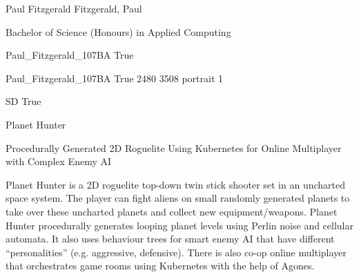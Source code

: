 
\begingroup{}\relax



\def\Key{Paul_Fitzgerald_107BA}

{Paul Fitzgerald}
{Fitzgerald, Paul}

{Bachelor of Science (Honours) in Applied Computing}

{Paul_Fitzgerald_107BA}
{True}

{Paul_Fitzgerald_107BA}
{True}
{2480}
{3508}
{portrait}
{1}

{SD}
{True}

{Planet Hunter}

{Procedurally Generated 2D Roguelite Using Kubernetes for Online Multiplayer with Complex Enemy AI}

{Planet Hunter is a 2D roguelite top-down twin stick shooter set in an uncharted space system. The player can fight aliens on small randomly generated planets to take over these uncharted planets and collect new equipment/weapons. Planet Hunter procedurally generates looping planet levels using Perlin noise and cellular automata. It also uses behaviour trees for smart enemy AI that have different \textquotedblleft{}personalities\textquotedblright{} (e.g. aggressive, defensive). There is also co-op online multiplayer that orchestrates game rooms using Kubernetes with the help of Agones.}


